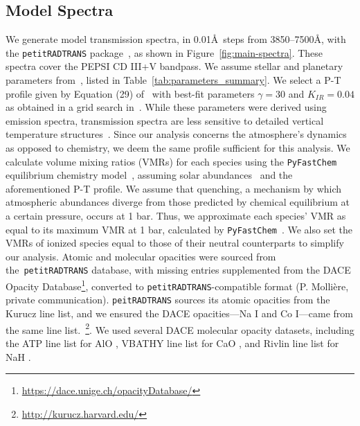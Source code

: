 \documentclass[twocolumn]{aastex631}
\newcommand{\code}[1]{\texttt{#1}}
\begin{document}
        \subsection{Model Spectra}\label{subsec:Model Spectra}
            We generate model transmission spectra, in 0.01\AA\ steps from 3850--7500\AA, with the \code{petitRADTRANS} package~\citep{petitRADTRANS}, as shown in Figure~\ref{fig:main-spectra}. These spectra cover the PEPSI CD III+V bandpass. We assume stellar and planetary parameters from~\citet{Lund2017}, listed in Table~\ref{tab:parameters_summary}. We select a P-T profile given by Equation (29) of~\citet{Guillot2010} with best-fit parameters $\gamma = 30$ and $K_{IR} = 0.04$ as obtained in a grid search in~\citet{Johnson2023}. While these parameters were derived using emission spectra, transmission spectra are less sensitive to detailed vertical temperature structures~\citep{Kesseli2020}. Since our analysis concerns the atmosphere's dynamics as opposed to chemistry, we deem the same profile sufficient for this analysis. 
            We calculate volume mixing ratios (VMRs) for each species using the \code{PyFastChem} equilibrium chemistry model~\citep{Stock2018, Stock2022, Kitzmann2023}, assuming solar abundances~\citep{Asplund2021} and the aforementioned P-T profile. We assume that quenching, a mechanism by which atmospheric abundances diverge from those predicted by chemical equilibrium at a certain pressure, occurs at 1 bar. Thus, we approximate each species' VMR as equal to its maximum VMR at 1 bar, calculated by \code{PyFastChem}~\citep{Johnson2023,Petz2023}. We also set the VMRs of ionized species equal to those of their neutral counterparts to simplify our analysis. 
            Atomic and molecular opacities were sourced from the~\code{petitRADTRANS} database, with missing entries supplemented from the DACE Opacity Database\footnote{\url{https://dace.unige.ch/opacityDatabase/}}, converted to \code{petitRADTRANS}-compatible format (P. Mollière, private communication). \code{peitRADTRANS} sources its atomic opacities from the Kurucz line list, and we ensured the DACE opacities---Na I and Co I---came from the same line list.~\footnote{\url{http://kurucz.harvard.edu/}}. We used several DACE molecular opacity datasets, including the ATP line list for AlO \citep{ATP}, VBATHY line list for CaO \citep{VBATHY}, and Rivlin line list for NaH \citep{Rivlin}.
            
\end{document}
